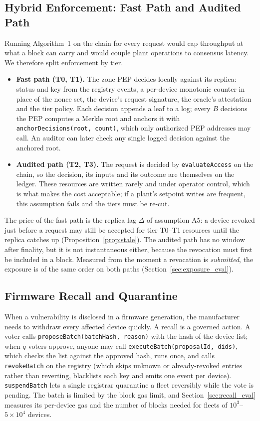 \subsection{Hybrid Enforcement: Fast Path and Audited Path}\label{sec:hybrid}
Running Algorithm~1 on the chain for every request would cap throughput at what a block can carry and would couple plant operations to consensus latency. We therefore split enforcement by tier.
\begin{itemize}[leftmargin=1.1em,itemsep=0pt,topsep=1pt]
  \item \textbf{Fast path (T0, T1).} The zone PEP decides locally against its replica: status and key from the registry events, a per-device monotonic counter in place of the nonce set, the device's request signature, the oracle's attestation and the tier policy. Each decision appends a leaf to a log; every $B$ decisions the PEP computes a Merkle root and anchors it with \texttt{anchorDecisions(root, count)}, which only authorized PEP addresses may call. An auditor can later check any single logged decision against the anchored root.
  \item \textbf{Audited path (T2, T3).} The request is decided by \texttt{evaluateAccess} on the chain, so the decision, its inputs and its outcome are themselves on the ledger. These resources are written rarely and under operator control, which is what makes the cost acceptable; if a plant's setpoint writes are frequent, this assumption fails and the tiers must be re-cut.
\end{itemize}
The price of the fast path is the replica lag $\Delta$ of assumption A5: a device revoked just before a request may still be accepted for tier T0--T1 resources until the replica catches up (Proposition~\ref{prop:stale}). The audited path has no window after finality, but it is not instantaneous either, because the revocation must first be included in a block. Measured from the moment a revocation is \emph{submitted}, the exposure is of the same order on both paths (Section~\ref{sec:exposure_eval}).

\subsection{Firmware Recall and Quarantine}\label{sec:recall}
When a vulnerability is disclosed in a firmware generation, the manufacturer needs to withdraw every affected device quickly. A recall is a governed action. A voter calls \texttt{proposeBatch(batchHash, reason)} with the hash of the device list; when $q$ voters approve, anyone may call \texttt{executeBatch(proposalId, dids)}, which checks the list against the approved hash, runs once, and calls \texttt{revokeBatch} on the registry (which skips unknown or already-revoked entries rather than reverting, blacklists each key and emits one event per device). \texttt{suspendBatch} lets a single registrar quarantine a fleet reversibly while the vote is pending. The batch is limited by the block gas limit, and Section~\ref{sec:recall_eval} measures its per-device gas and the number of blocks needed for fleets of $10^3$--$5\times10^4$ devices.

